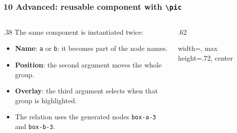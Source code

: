 
\begin{frame}
    \frametitle{10 Advanced: reusable component with \texttt{\textbackslash pic}}

    \begin{columns}[T]
        \begin{column}{.38\textwidth}
            The same component is instantiated twice:

            \vspace{.5em}

            \begin{itemize}\setlength{\itemsep}{.7em}
                \item \textbf{Name}: \texttt{a} or \texttt{b}; it becomes part of the node names.
                \item \textbf{Position}: the second argument moves the whole group.
                \item \textbf{Overlay}: the third argument selects when that group is highlighted.
                \item The relation uses the generated nodes
                    \texttt{box-a-3} and \texttt{box-b-3}.
            \end{itemize}
        \end{column}
        \begin{column}{.62\textwidth}
            \begin{adjustbox}{width=\linewidth, max height=.72\textheight, center}
                
            \end{adjustbox}
        \end{column}
    \end{columns}
\end{frame}
